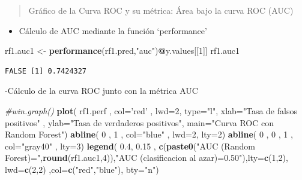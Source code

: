 \documentclass[]{book}
\newenvironment{Shaded}{\begin{snugshade}}{\end{snugshade}}
\newcommand{\CommentTok}[1]{\textcolor[rgb]{0.56,0.35,0.01}{\textit{#1}}}
\newcommand{\DataTypeTok}[1]{\textcolor[rgb]{0.13,0.29,0.53}{#1}}
\newcommand{\DecValTok}[1]{\textcolor[rgb]{0.00,0.00,0.81}{#1}}
\newcommand{\FloatTok}[1]{\textcolor[rgb]{0.00,0.00,0.81}{#1}}
\newcommand{\KeywordTok}[1]{\textcolor[rgb]{0.13,0.29,0.53}{\textbf{#1}}}
\newcommand{\NormalTok}[1]{#1}
\newcommand{\OperatorTok}[1]{\textcolor[rgb]{0.81,0.36,0.00}{\textbf{#1}}}
\newcommand{\StringTok}[1]{\textcolor[rgb]{0.31,0.60,0.02}{#1}}
\providecommand{\tightlist}{%
  \setlength{\itemsep}{0pt}\setlength{\parskip}{0pt}}
\begin{document}
\begin{quote}
Gráfico de la Curva ROC y su métrica: Área bajo la curva ROC (AUC)
\end{quote}

\begin{itemize}
\tightlist
\item
  Cálculo de AUC mediante la función `performance'
\end{itemize}

\begin{Shaded}
\begin{Highlighting}[]
\NormalTok{rf1.auc1 <-}\StringTok{ }\KeywordTok{performance}\NormalTok{(rf1.pred,}\StringTok{"auc"}\NormalTok{)}\OperatorTok{@}\NormalTok{y.values[[}\DecValTok{1}\NormalTok{]]}
\NormalTok{rf1.auc1}
\end{Highlighting}
\end{Shaded}

\begin{verbatim}
FALSE [1] 0.7424327
\end{verbatim}

-Cálculo de la curva ROC junto con la métrica AUC

\begin{Shaded}
\begin{Highlighting}[]
\CommentTok{#win.graph()}
\KeywordTok{plot}\NormalTok{( rf1.perf , }\DataTypeTok{col=}\StringTok{'red'}\NormalTok{  , }\DataTypeTok{lwd=}\DecValTok{2}\NormalTok{, }\DataTypeTok{type=}\StringTok{"l"}\NormalTok{, }\DataTypeTok{xlab=}\StringTok{"Tasa de falsos positivos"}\NormalTok{ , }\DataTypeTok{ylab=}\StringTok{"Tasa de verdaderos positivos"}\NormalTok{, }\DataTypeTok{main=}\StringTok{"Curva ROC con Random Forest"}\NormalTok{)}
\KeywordTok{abline}\NormalTok{( }\DecValTok{0}\NormalTok{ , }\DecValTok{1}\NormalTok{  , }\DataTypeTok{col=}\StringTok{"blue"}\NormalTok{ , }\DataTypeTok{lwd=}\DecValTok{2}\NormalTok{, }\DataTypeTok{lty=}\DecValTok{2}\NormalTok{)}
\KeywordTok{abline}\NormalTok{( }\DecValTok{0}\NormalTok{ , }\DecValTok{0}\NormalTok{ , }\DecValTok{1}\NormalTok{ , }\DataTypeTok{col=}\StringTok{"gray40"}\NormalTok{   , }\DataTypeTok{lty=}\DecValTok{3}\NormalTok{)}
\KeywordTok{legend}\NormalTok{( }\FloatTok{0.4}\NormalTok{, }\FloatTok{0.15}\NormalTok{ , }\KeywordTok{c}\NormalTok{(}\KeywordTok{paste0}\NormalTok{(}\StringTok{"AUC (Random Forest)="}\NormalTok{,}\KeywordTok{round}\NormalTok{(rf1.auc1,}\DecValTok{4}\NormalTok{)),}\StringTok{"AUC (clasificacion al azar)=0.50"}\NormalTok{),}\DataTypeTok{lty=}\KeywordTok{c}\NormalTok{(}\DecValTok{1}\NormalTok{,}\DecValTok{2}\NormalTok{), }\DataTypeTok{lwd=}\KeywordTok{c}\NormalTok{(}\DecValTok{2}\NormalTok{,}\DecValTok{2}\NormalTok{) ,}\DataTypeTok{col=}\KeywordTok{c}\NormalTok{(}\StringTok{"red"}\NormalTok{,}\StringTok{"blue"}\NormalTok{), }\DataTypeTok{bty=}\StringTok{"n"}\NormalTok{)}
\end{Highlighting}
\end{Shaded}
\end{document}
